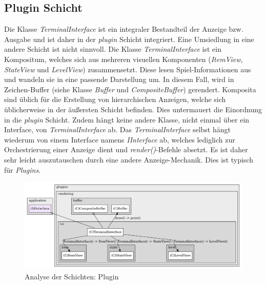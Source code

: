 \subsection*{Plugin Schicht}
Die Klasse \textit{TerminalInterface} ist ein integraler Bestandteil
der Anzeige bzw. Ausgabe und ist daher in der \textit{plugin} Schicht
integriert. Eine Umsiedlung in eine andere Schicht ist nicht sinnvoll.
Die Klasse \textit{TerminalInterface} ist ein Kompositum, welches
sich aus mehreren visuellen Komponenten (\textit{ItemView}, 
\textit{StateView} und \textit{LevelView}) zusammensetzt. Diese lesen
Spiel-Informationen aus und wandeln sie in eine passende Darstellung
um. In diesem Fall, wird in Zeichen-Buffer (siehe Klasse \textit{Buffer}
und \textit{CompositeBuffer}) gerendert. Komposita sind üblich für die
Erstellung von hierarchischen Anzeigen, welche sich üblicherweise in
der äußersten Schicht befinden. Dies untermauert die Einordnung in die
\textit{plugin} Schicht. Zudem hängt keine andere Klasse, nicht einmal
über ein Interface, von \textit{TerminalInterface} ab. Das 
\textit{TerminalInterface} selbst hängt wiederum von einem Interface
namens \textit{IInterface} ab, welches lediglich zur Orchestrierung
einer Anzeige dient und \textit{render()}-Befehle absetzt. Es ist
daher sehr leicht auszutauschen durch eine andere Anzeige-Mechanik.
Dies ist typisch für \textit{Plugins}.

\vspace{0.5cm}
\begin{figure}[H]
    \centering
    \includegraphics[width=0.9\linewidth]{Bilder/Visualisierung/TerminalInterface_structure.png}
    \caption{Analyse der Schichten: Plugin}
\end{figure}